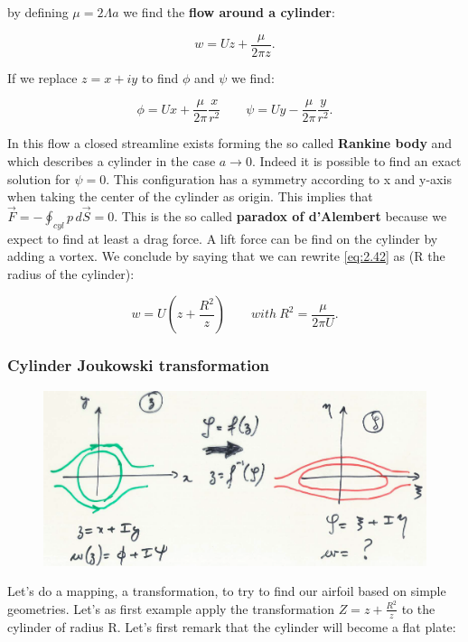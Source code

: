 		by defining $\mu = 2\Lambda a$ we find the \textbf{flow around a cylinder}:
		
		\begin{equation}
		w = Uz + \frac{\mu }{2\pi z}.
		\label{eq:2.42}
		\end{equation}
		
		If we replace $z= x+iy$ to find $\phi$ and $\psi$ we find:
		
		\begin{equation}
		\phi = Ux + \frac{\mu}{2\pi }\frac{x}{r^2} \qquad \psi = Uy - \frac{\mu }{2\pi} \frac{y}{r^2}.
		\end{equation}
		
		In this flow a closed streamline exists forming the so called \textbf{Rankine body} and which describes a cylinder in the case $a\rightarrow 0$. Indeed it is possible to find an exact solution for $\psi = 0$. This configuration has a symmetry according to x and y-axis when taking the center of the cylinder as origin. This implies that $\vec{F} = - \oint _{cyl} p\, d\vec{S} = 0$. This is the so called \textbf{paradox of d'Alembert} because we expect to find at least a drag force. A lift force can be find on the cylinder by adding a vortex. We conclude by saying that we can rewrite \eqref{eq:2.42} as (R the radius of the cylinder):
		
		\begin{equation}
		w = U\left( z + \frac{R^2}{z} \right) \qquad with \ R^2 = \frac{\mu }{2\pi U}.
		\end{equation}
		
		\newpage
		
	\subsubsection{Cylinder Joukowski transformation}
		\begin{figure}
		\vspace{-5mm}
		\includegraphics[scale=0.2]{ch2/28}
		\end{figure}
		Let's do a mapping, a transformation, to try to find our airfoil based on simple geometries. Let's as first example apply the transformation $Z = z + \frac{R^2}{z}$ to the cylinder of radius R. Let's first remark that the cylinder will become a flat plate:
		
